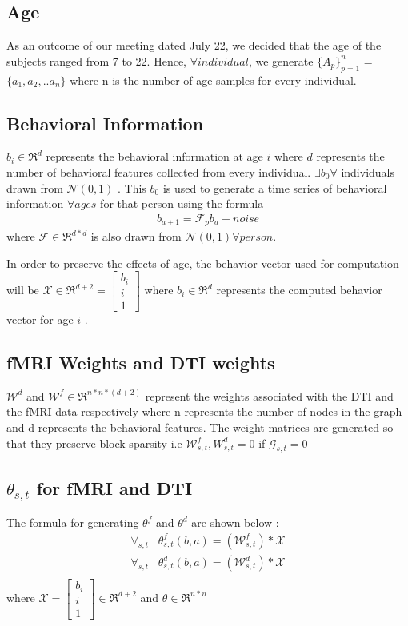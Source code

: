\documentclass[a4paper,10pt]{article}
\begin{document}
\subsection{Age}
As an outcome of our meeting dated July 22, we decided that the age of the subjects ranged from 7 to 22. Hence, $\forall individual$, we generate $\{A_{p}\}_{p=1}^{n}$ = $\{a_{1},a_{2}, .. a_{n}\}$ where n is the number of age samples for every individual.
\subsection{Behavioral Information}
$b_{i} \in \Re^{d}$ represents the behavioral information at age $i$ where $d$ represents the number of behavioral features collected from every individual. $\exists b_{0} \forall$ individuals drawn from $\mathcal{N}(0,1)$ . This $b_{0}$ is used to generate a time series of behavioral information $\forall ages$ for that person using the formula
\begin{align*}
b_{a+1}=\mathcal{F}_{p}b_{a} + noise
\end{align*}
where $\mathcal{F} \in \Re^{d*d}$ is also drawn from $\mathcal{N}(0,1) \forall person$.  

In order to preserve the effects of age, the behavior vector used for computation will be $\mathcal{X} \in \Re^{d+2} = \begin{bmatrix}
      b_{i} \\
      i \\
      1
    \end{bmatrix}$ where $b_{i} \in \Re^{d}$ represents the computed behavior vector for age $i$ . 
\subsection{fMRI Weights and DTI weights}
$\mathcal{W}^{d}$ and $\mathcal{W}^{f} \in \Re^{n*n*(d+2)}$  represent the weights associated with the DTI and the fMRI data respectively where n represents the number of nodes in the graph and d represents the behavioral features. The weight matrices are generated so that they preserve block sparsity i.e $\mathcal{W}^{f}_{s,t},{W}^{d}_{s,t}=0$ if $\mathcal{G}_{s,t}=0$
\subsection{$\theta_{s,t}$ for fMRI and DTI}
The formula for generating $\theta^{f}$ and $\theta^{d}$ are shown below :
\begin{align*}
\forall _{s,t} \hspace{10pt} \theta^{f}_{s,t}(b,a)= (\mathcal{W}^f_{s,t}) * \mathcal{X} \\
\forall _{s,t} \hspace{10pt} \theta^{d}_{s,t}(b,a)= (\mathcal{W}^d_{s,t}) * \mathcal{X} \\
\end{align*}
where $\mathcal{X} =
\begin{bmatrix}
      b_{i} \\
      i \\
      1
    \end{bmatrix} \in \Re^{d+2}$ and $\theta \in \Re^{n*n}$
\end{document}
